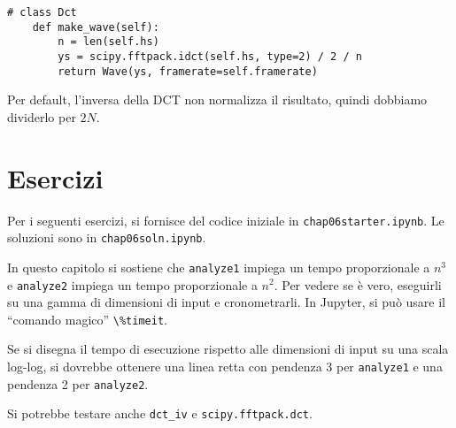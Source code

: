 \documentclass[12pt]{book} \usepackage[width=5.5in,height=8.5in, hmarginratio=3:2,vmarginratio=1:1]{geometry}
\begin{document}
\begin{verbatim} 
# class Dct
    def make_wave(self):
        n = len(self.hs)
        ys = scipy.fftpack.idct(self.hs, type=2) / 2 / n
        return Wave(ys, framerate=self.framerate)
 \end{verbatim} 

Per default, l'inversa della DCT non normalizza il risultato, quindi dobbiamo dividerlo per $2N$.

\section{Esercizi} 

Per i seguenti esercizi, si fornisce del codice iniziale in {\tt chap06starter.ipynb}. Le soluzioni sono in {\tt chap06soln.ipynb}.

\begin{exercise} In questo capitolo si sostiene che {\tt analyze1} impiega un tempo proporzionale a $n^3$ e {\tt analyze2} impiega un tempo proporzionale a $n^2$. Per vedere se è vero, eseguirli su una gamma di dimensioni di input e cronometrarli. In Jupyter, si può usare il ``comando magico'' \verb"\%timeit".

Se si disegna il tempo di esecuzione rispetto alle dimensioni di input su una scala log-log, si dovrebbe ottenere una linea retta con pendenza 3 per {\tt analyze1} e una pendenza 2 per {\tt analyze2}.

Si potrebbe testare anche \verb"dct_iv" e {\tt scipy.fftpack.dct}.

\end{exercise} 
\end{document}
